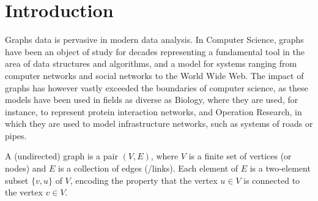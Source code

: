 \section{Introduction}
Graphs data is pervasive in modern data analysis. In Computer Science, graphs have been an object of study for decades representing a fundamental tool in the area of data structures and algorithms, and a model for systems ranging from computer networks and social networks to the World Wide Web. The impact of graphs has however vastly exceeded the boundaries of computer science, as these models have been used in fields as diverse as Biology, where they are used, for instance, to represent protein interaction networks, and Operation Research, in which they are used to model infrastructure networks, such as systems of roads or pipes.

A (undirected) graph is a pair $(V,E)$, where $V$ is a finite set of vertices (or nodes) and $E$ is a collection of edges (/links). Each element of $E$ is a two-element subset $\{v,u\}$ of $V$, encoding the property that the vertex $u \in V$ is connected to the vertex $v \in V$.
